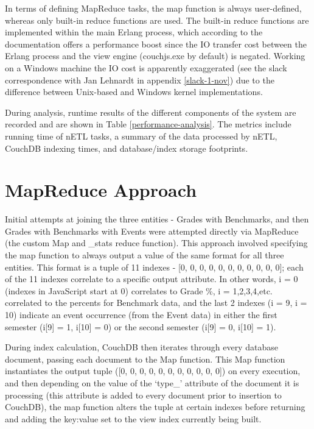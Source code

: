 In terms of defining MapReduce tasks, the map function is always user-defined, whereas only built-in reduce functions are used. The built-in reduce functions are implemented within the main Erlang process, which according to the documentation offers a performance boost since the IO transfer cost between the Erlang process and the view engine (couchjs.exe by default) is negated. Working on a Windows machine the IO cost is apparently exaggerated (see the slack correspondence with Jan Lehnardt in appendix \ref{slack-1-nov}) due to the difference between Unix-based and Windows kernel implementations.

During analysis, runtime results of the different components of the system are recorded and are shown in Table \ref{performance-analysis}. The metrics include running time of nETL tasks, a summary of the data processed by nETL, CouchDB indexing times, and database/index storage footprints.



\section{MapReduce Approach}
Initial attempts at joining the three entities - Grades with Benchmarks, and then Grades with Benchmarks with Events were attempted directly via MapReduce (the custom Map and \_stats reduce function). This approach involved specifying the map function to always output a value of the same format for all three entities. This format is a tuple of 11 indexes - [0, 0, 0, 0, 0, 0, 0, 0, 0, 0, 0]; each of the 11 indexes correlate to a specific output attribute. In other words, i = 0 (indexes in JavaScript start at 0) correlates to Grade \%, i = 1,2,3,4,etc. correlated to the percents for Benchmark data, and the last 2 indexes (i = 9, i = 10) indicate an event occurrence (from the Event data) in either the first semester (i[9] = 1, i[10] = 0) or the second semester (i[9] = 0, i[10] = 1).

During index calculation, CouchDB then iterates through every database document, passing each document to the Map function. This Map function instantiates the output tuple ([0, 0, 0, 0, 0, 0, 0, 0, 0, 0, 0]) on every execution, and then depending on the value of the `type\_' attribute of the document it is processing (this attribute is added to every document prior to insertion to CouchDB), the map function alters the tuple at certain indexes before returning and adding the key:value set to the view index currently being built.

